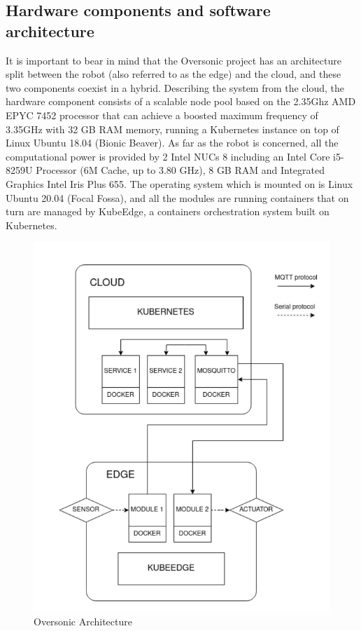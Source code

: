 \subsection{Hardware components and software architecture}
It is important to bear in mind that the Oversonic project has an architecture split between the
robot (also referred to as the edge) and the cloud, and these two components coexist in a
hybrid.
Describing the system from the cloud, the hardware component consists of a scalable node pool based on
the 2.35Ghz AMD EPYC 7452 processor that can achieve a boosted maximum frequency
of 3.35GHz with 32 GB RAM memory, running a Kubernetes instance on top of Linux
Ubuntu 18.04 (Bionic Beaver).
As far as the robot is concerned, all the computational power is provided by 2 Intel NUCs 8 including an Intel Core i5-8259U Processor (6M Cache, up to 3.80 GHz), 8 GB RAM and Integrated Graphics Intel Iris Plus 655.
The operating system which is mounted on is Linux Ubuntu 20.04 (Focal Fossa), and all the modules are running containers that on turn are managed by KubeEdge, a containers orchestration system built on Kubernetes.
\begin{figure}[H]
    \centering
    \includegraphics[scale=0.6]{Images/Chapter 3/oversonicarch.png}
    \caption{Oversonic Architecture}
    \label{fig:oversonicarch}
\end{figure}
